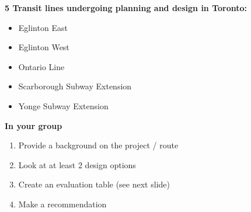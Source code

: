 \documentclass[aspectratio=169]{beamer}
\begin{document}
\begin{frame}
	
	\textbf{5 Transit lines undergoing planning and design in Toronto:}
	
	\begin{itemize}
		\item Eglinton East
		\item Eglinton West
		\item Ontario Line
		\item Scarborough Subway Extension
		\item Yonge Subway Extension
	\end{itemize}
	
	\textbf{In your group}
	
	\begin{enumerate}
		\item Provide a background on the project / route
		\item Look at at least 2 design options
		\item Create an evaluation table (see next slide)
		\item Make a recommendation
	\end{enumerate}
	
\end{frame}
\end{document}
